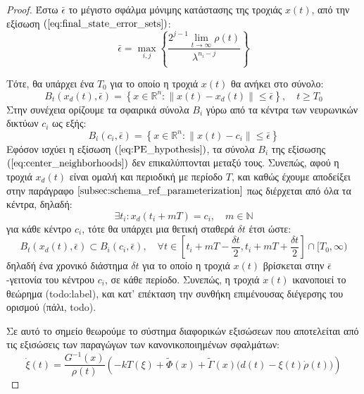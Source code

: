 \begin{proof}
	
Έστω $\bar{\epsilon}$ το μέγιστο σφάλμα μόνιμης κατάστασης της τροχιάς $x(t)$, από την εξίσωση $(\ref{eq:final_state_error_sets})$:
\begin{equation}
	\bar{\epsilon} = \max_{i,j} \left\{ \frac{ 2^{j-1} \lim\limits_{t \rightarrow \infty}\rho(t)}{\lambda^{n_i - j}} \right\}
\end{equation}

Τότε, θα υπάρχει ένα $T_0$ για το οποίο η τροχιά $x(t)$ θα ανήκει στο σύνολο:
\begin{equation}
	B_t(x_d(t),\bar{\epsilon} ) = 
	\left\{ x \in\mathbb{R}^n : \| x(t) - x_d(t) \| \leq \bar{\epsilon} \right\},
	\quad t \geq T_0
\end{equation}
Στην συνέχεια ορίζουμε τα σφαιρικά σύνολα $B_i$ γύρω από τα κέντρα των νευρωνικών δικτύων $c_i$ ως εξής:
\begin{equation}
B_i(c_i,\bar{\epsilon} ) = 
\left\{ x \in\mathbb{R}^n : \| x(t) - c_i \| \leq \bar{\epsilon} \right\}
\label{eq:center_neighborhoods}
\end{equation}
Εφόσον ισχύει η εξίσωση $(\ref{eq:PE_hypothesis})$, τα σύνολα $B_i$ της εξίσωσης $(\ref{eq:center_neighborhoods})$ δεν επικαλύπτονται μεταξύ τους. Συνεπώς, αφού η τροχιά $x_d(t)$ είναι ομαλή και περιοδική με περίοδο $T$, και καθώς έχουμε αποδείξει στην παράγραφο $\ref{subsec:schema_ref_parameterization}$ πως διέρχεται από όλα τα κέντρα, δηλαδή:
\begin{equation*}
	\exists t_i : x_d(t_i + mT) = c_i, \quad m \in \mathbb{N} 
\end{equation*}
για κάθε κέντρο $c_i$, τότε θα υπάρχει μια θετική σταθερά $\delta t$ έτσι ώστε:
\begin{equation*}
	B_t(x_d(t),\bar{\epsilon} ) \subset B_i(c_i,\bar{\epsilon} ), 
	\quad \forall t \in \left[t_i + mT - \frac{\delta t}{2}, t_i + mT + \frac{\delta t}{2} \right] \cap [T_0, \infty)
\end{equation*}
δηλαδή ένα χρονικό διάστημα $\delta t$ για το οποίο η τροχιά $x(t)$ βρίσκεται στην $\bar{\epsilon}$-γειτονία του κέντρου $c_i$, σε κάθε περίοδο. Συνεπώς, η τροχιά $x(t)$ ικανοποιεί το θεώρημα (todo:label), και κατ' επέκταση την συνθήκη επιμένουσας διέγερσης του ορισμού (πάλι, todo).

Σε αυτό το σημείο θεωρούμε το σύστημα διαφορικών εξισώσεων που αποτελείται από τις εξισώσεις των παραγώγων των κανονικοποιημένων σφαλμάτων:
\begin{equation}
	\dot{\xi}(t) 
	=\frac{G^{-1}(x)}{\rho(t)} \left( -k T(\xi) + \tilde{\Phi}(x) + 
	\tilde{\Gamma}(x) \big( d(t) - \xi(t)\dot{\rho}(t) \big) \right)
\end{equation}


\end{proof}
